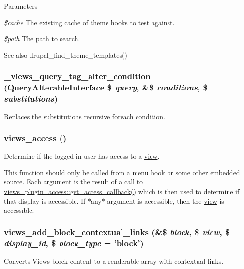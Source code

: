 \begin{DoxyParams}{Parameters}
\item[{\em \$cache}]The existing cache of theme hooks to test against. \item[{\em \$path}]The path to search.\end{DoxyParams}
\begin{DoxySeeAlso}{See also}
drupal\_\-find\_\-theme\_\-templates() 
\end{DoxySeeAlso}
\hypertarget{views_8module_a51cb108c148c7478b50e6262e216a17d}{
\subsubsection[{\_\-views\_\-query\_\-tag\_\-alter\_\-condition}]{\setlength{\rightskip}{0pt plus 5cm}\_\-views\_\-query\_\-tag\_\-alter\_\-condition (QueryAlterableInterface \$ {\em query}, \/  \&\$ {\em conditions}, \/  \$ {\em substitutions})}}
\label{views_8module_a51cb108c148c7478b50e6262e216a17d}
Replaces the substitutions recursive foreach condition. \hypertarget{views_8module_a3ecb735baf489bc115f6de9549d8fe81}{
\subsubsection[{views\_\-access}]{\setlength{\rightskip}{0pt plus 5cm}views\_\-access ()}}
\label{views_8module_a3ecb735baf489bc115f6de9549d8fe81}
Determine if the logged in user has access to a \hyperlink{classview}{view}.

This function should only be called from a menu hook or some other embedded source. Each argument is the result of a call to \hyperlink{classviews__plugin__access_ad4038a32fccc6a662a74f437d0bf6a23}{views\_\-plugin\_\-access::get\_\-access\_\-callback()} which is then used to determine if that display is accessible. If $\ast$any$\ast$ argument is accessible, then the \hyperlink{classview}{view} is accessible. \hypertarget{views_8module_a45becd00bbd9f1fa7e672af1513200d5}{
\subsubsection[{views\_\-add\_\-block\_\-contextual\_\-links}]{\setlength{\rightskip}{0pt plus 5cm}views\_\-add\_\-block\_\-contextual\_\-links (\&\$ {\em block}, \/  \$ {\em view}, \/  \$ {\em display\_\-id}, \/  \$ {\em block\_\-type} = {\ttfamily 'block'})}}
\label{views_8module_a45becd00bbd9f1fa7e672af1513200d5}
Converts Views block content to a renderable array with contextual links.



